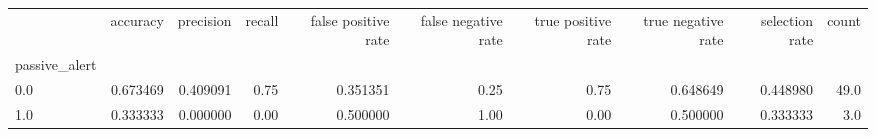 \begin{tabular}{lrrrrrrrrr}
\toprule
{} &  accuracy &  precision &  recall &  false positive rate &  false negative rate &  true positive rate &  true negative rate &  selection rate &  count \\
passive\_alert &           &            &         &                      &                      &                     &                     &                 &        \\
\midrule
0.0           &  0.673469 &   0.409091 &    0.75 &             0.351351 &                 0.25 &                0.75 &            0.648649 &        0.448980 &   49.0 \\
1.0           &  0.333333 &   0.000000 &    0.00 &             0.500000 &                 1.00 &                0.00 &            0.500000 &        0.333333 &    3.0 \\
\bottomrule
\end{tabular}
